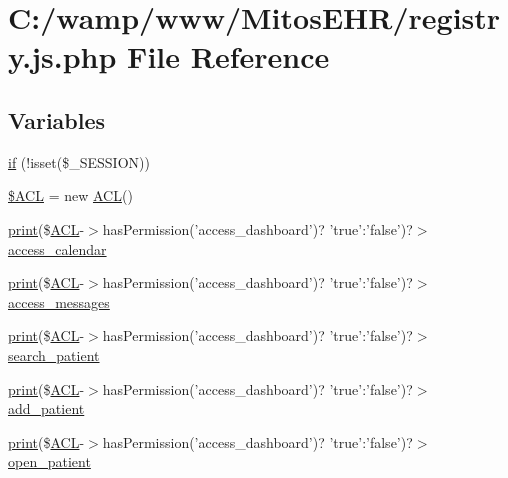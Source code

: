 \hypertarget{registry_8js_8php}{\section{\-C\-:/wamp/www/\-Mitos\-E\-H\-R/registry.js.\-php \-File \-Reference}
\label{registry_8js_8php}
}
\subsection*{\-Variables}
\begin{DoxyCompactItemize}
\item 
\hyperlink{registry_8js_8php_a8ceca98aa29914fd2479a84a8d2242fb}{if} (!isset(\$\-\_\-\-S\-E\-S\-S\-I\-O\-N))
\item 
\hyperlink{registry_8js_8php_a0e6e927aed984ad8947f77bf803b70bb}{\$\-A\-C\-L} = new \hyperlink{class_a_c_l}{\-A\-C\-L}()
\item 
\hyperlink{tokenizer__test_8php_a3ad3a4240c0f97c7e85aff5c52a454d4}{print}(\$\hyperlink{class_a_c_l}{\-A\-C\-L}-\/$>$has\-Permission('access\-\_\-dashboard')? \*
'true'\-:'false')?$>$ \hyperlink{registry_8js_8php_a9ced7ed4196dcc2c8d961cadca45c40d}{access\-\_\-calendar}
\item 
\hyperlink{tokenizer__test_8php_a3ad3a4240c0f97c7e85aff5c52a454d4}{print}(\$\hyperlink{class_a_c_l}{\-A\-C\-L}-\/$>$has\-Permission('access\-\_\-dashboard')? \*
'true'\-:'false')?$>$ \hyperlink{registry_8js_8php_acb1a6640ff0a1d474e646f76056e79c1}{access\-\_\-messages}
\item 
\hyperlink{tokenizer__test_8php_a3ad3a4240c0f97c7e85aff5c52a454d4}{print}(\$\hyperlink{class_a_c_l}{\-A\-C\-L}-\/$>$has\-Permission('access\-\_\-dashboard')? \*
'true'\-:'false')?$>$ \hyperlink{registry_8js_8php_aa992f07730be62ab3df228e1f588b581}{search\-\_\-patient}
\item 
\hyperlink{tokenizer__test_8php_a3ad3a4240c0f97c7e85aff5c52a454d4}{print}(\$\hyperlink{class_a_c_l}{\-A\-C\-L}-\/$>$has\-Permission('access\-\_\-dashboard')? \*
'true'\-:'false')?$>$ \hyperlink{registry_8js_8php_a28f090e727c9c74ce03f8618d5c8f47a}{add\-\_\-patient}
\item 
\hyperlink{tokenizer__test_8php_a3ad3a4240c0f97c7e85aff5c52a454d4}{print}(\$\hyperlink{class_a_c_l}{\-A\-C\-L}-\/$>$has\-Permission('access\-\_\-dashboard')? \*
'true'\-:'false')?$>$ \hyperlink{registry_8js_8php_a24c830a005c6465b104572d9743cd879}{open\-\_\-patient}
\item 

\end{DoxyCompactItemize}
